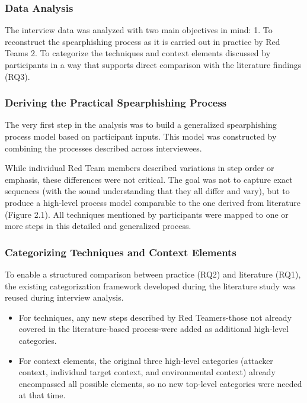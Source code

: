 \subsubsection{Data Analysis}

The interview data was analyzed with two main objectives in mind:
1. To reconstruct the spearphishing process as it is carried out in practice by Red Teams
2. To categorize the techniques and context elements discussed by participants in a way that supports direct comparison with the literature findings (RQ3).

\subsubsection{Deriving the Practical Spearphishing Process}
The very first step in the analysis was to build a generalized spearphishing process model based on participant inputs. This model was constructed by combining the processes described across interviewees.

While individual Red Team members described variations in step order or emphasis, these differences were not critical. The goal was not to capture exact sequences (with the sound understanding that they all differ and vary), but to produce a high-level process model comparable to the one derived from literature (Figure 2.1). All techniques mentioned by participants were mapped to one or more steps in this detailed and generalized process.

\subsubsection{Categorizing Techniques and Context Elements}
To enable a structured comparison between practice (RQ2) and literature (RQ1), the existing categorization framework developed during the literature study was reused during interview analysis.
\begin{itemize}
    \item For techniques, any new steps described by Red Teamers-those not already covered in the literature-based process-were added as additional high-level categories.
    \item For context elements, the original three high-level categories (attacker context, individual target context, and environmental context) already encompassed all possible elements, so no new top-level categories were needed at that time.
\end{itemize}

